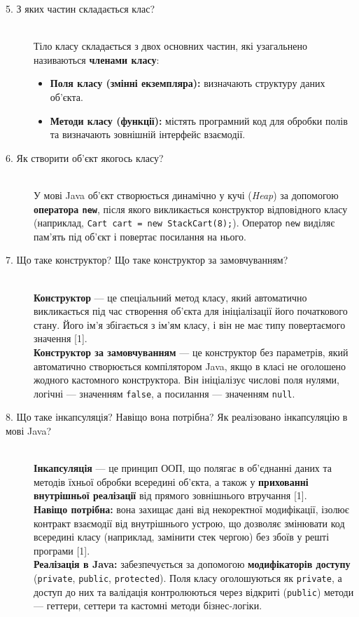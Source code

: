 \begin{description}
    \item[5. З яких частин складається клас?] ~\\
    Тіло класу складається з двох основних частин, які узагальнено називаються 
    \textbf{членами класу}:
    \begin{itemize}
        \item \textbf{Поля класу (змінні екземпляра):} визначають структуру даних об'єкта.
        \item \textbf{Методи класу (функції):} містять програмний код для обробки полів та визначають зовнішній інтерфейс взаємодії.
    \end{itemize}

    \item[6. Як створити об'єкт якогось класу?] ~\\
    У мові Java об'єкт створюється динамічно у кучі (\textit{Heap}) за допомогою 
    \textbf{оператора \texttt{new}}, після якого викликається конструктор відповідного класу
     (наприклад, \texttt{Cart cart = new StackCart(8);}). Оператор \texttt{new} виділяє пам'ять 
     під об'єкт і повертає посилання на нього.

    \item[7. Що таке конструктор? Що таке конструктор за замовчуванням?] ~\\
    \textbf{Конструктор} — це спеціальний метод класу, який автоматично викликається під час створення об'єкта для ініціалізації його початкового стану. Його ім'я збігається з ім'ям класу, і він не має типу повертаємого значення [1].\\
    \textbf{Конструктор за замовчуванням} — це конструктор без параметрів, який автоматично створюється компілятором Java, якщо в класі не оголошено жодного кастомного конструктора. Він ініціалізує числові поля нулями, логічні — значенням \texttt{false}, а посилання — значенням \texttt{null}.

    \item[8. Що таке інкапсуляція? Навіщо вона потрібна? Як реалізовано інкапсуляцію в мові Java?] ~\\
    \textbf{Інкапсуляція} — це принцип ООП, що полягає в об'єднанні даних та методів їхньої обробки всередині об'єкта, а також у \textbf{прихованні внутрішньої реалізації} від прямого зовнішнього втручання [1].\\
    \textbf{Навіщо потрібна:} вона захищає дані від некоректної модифікації, ізолює контракт взаємодії від внутрішнього устрою, що дозволяє змінювати код всередині класу (наприклад, замінити стек чергою) без збоїв у решті програми [1].\\
    \textbf{Реалізація в Java:} забезпечується за допомогою \textbf{модифікаторів доступу} (\texttt{private}, \texttt{public}, \texttt{protected}). Поля класу оголошуються як \texttt{private}, а доступ до них та валідація контролюються через відкриті (\texttt{public}) методи — геттери, сеттери та кастомні методи бізнес-логіки.
\end{description}
